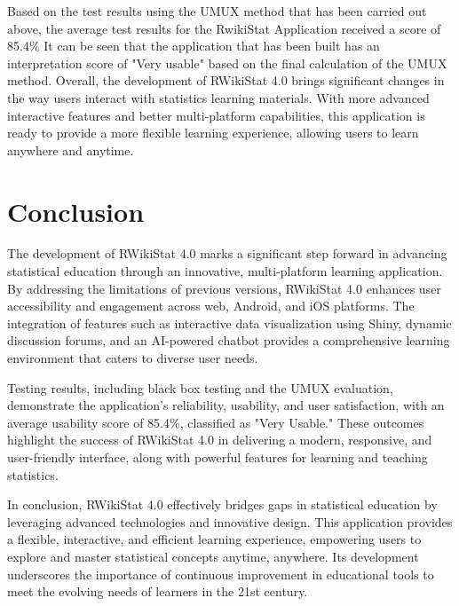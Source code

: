 \documentclass[conference,a4paper]{IEEEtran}
\begin{document}
Based on the test results using the UMUX method that has been carried out
above, the average test results for the RwikiStat Application received a score
of 85.4\% It can be seen that the application that has been built has an
interpretation score of "Very usable" based on the final calculation of the
UMUX method. Overall, the development of RWikiStat 4.0 brings significant
changes in the way users interact with statistics learning materials. With more
advanced interactive features and better multi-platform capabilities, this
application is ready to provide a more flexible learning experience, allowing
users to learn anywhere and anytime.

\section{Conclusion}
\label{sect:conclusion}
The development of RWikiStat 4.0 marks a significant step forward in advancing statistical education through an innovative, multi-platform learning application. By addressing the limitations of previous versions, RWikiStat 4.0 enhances user accessibility and engagement across web, Android, and iOS platforms. The integration of features such as interactive data visualization using Shiny, dynamic discussion forums, and an AI-powered chatbot provides a comprehensive learning environment that caters to diverse user needs.

Testing results, including black box testing and the UMUX evaluation,
demonstrate the application's reliability, usability, and user satisfaction,
with an average usability score of 85.4\%, classified as "Very Usable." These
outcomes highlight the success of RWikiStat 4.0 in delivering a modern,
responsive, and user-friendly interface, along with powerful features for
learning and teaching statistics.

In conclusion, RWikiStat 4.0 effectively bridges gaps in statistical education
by leveraging advanced technologies and innovative design. This application
provides a flexible, interactive, and efficient learning experience, empowering
users to explore and master statistical concepts anytime, anywhere. Its
development underscores the importance of continuous improvement in educational
tools to meet the evolving needs of learners in the 21st century.

\balance
\end{document}

